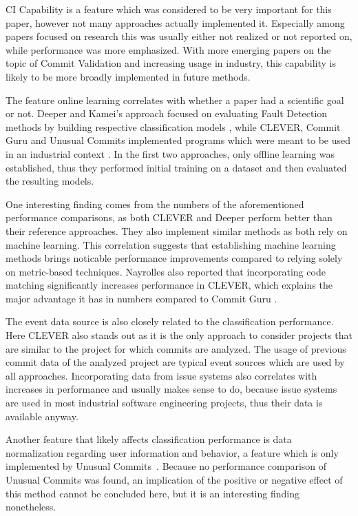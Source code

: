 CI Capability is a feature which was considered to be very important for this paper, however not many approaches actually implemented it. Especially among papers focused on research this was usually either not realized or not reported on, while performance was more emphasized. With more emerging papers on the topic of Commit Validation and increasing usage in industry, this capability is likely to be more broadly implemented in future methods.

The feature online learning correlates with whether a paper had a scientific goal or not. Deeper and Kamei's approach focused on evaluating Fault Detection methods by building respective classification models \cite{Yang2015, Kamei2013}, while CLEVER, Commit Guru and Unusual Commits implemented programs which were meant to be used in an industrial context \cite{Nayrolles2018,Rosen2015,Goyal2017}. In the first two approaches, only offline learning was established, thus they performed initial training on a dataset and then evaluated the resulting models.

One interesting finding comes from the numbers of the aforementioned performance comparisons, as both CLEVER and Deeper perform better than their reference approaches. They also implement similar methods as both rely on machine learning. This correlation suggests that establishing machine learning methods brings noticable performance improvements compared to relying solely on metric-based techniques. Nayrolles also reported that incorporating code matching significantly increases performance in CLEVER, which explains the major advantage it has in numbers compared to Commit Guru \cite{Nayrolles2018}.

The event data source is also closely related to the classification performance. Here CLEVER also stands out as it is the only approach to consider projects that are similar to the project for which commits are analyzed. The usage of previous commit data of the analyzed project are typical event sources which are used by all approaches. Incorporating data from issue systems also correlates with increases in performance and usually makes sense to do, because issue systems are used in most industrial software engineering projects, thus their data is available anyway.

Another feature that likely affects classification performance is data normalization regarding user information and behavior, a feature which is only implemented by Unusual Commits~\cite{Goyal2017}.
Because no performance comparison of Unusual Commits was found, an implication of the positive or negative effect of this method cannot be concluded here, but it is an interesting finding nonetheless.

